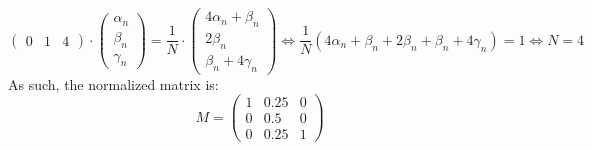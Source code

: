 \documentclass[11pt, legalpaper]{article}
\begin{document}
\begin{enumerate}
$$\begin{pmatrix}
        0 & 1 & 4
    \end{pmatrix} \cdot \begin{pmatrix} \alpha_n \\ \beta_n \\ \gamma_n \end{pmatrix}= \frac{1}{N} \cdot \begin{pmatrix} 4\alpha_n+\beta_n \\ 2\beta_n \\ \beta_n + 4\gamma_n \end{pmatrix} \Longleftrightarrow \frac{1}{N}(4\alpha_n+\beta_n +  2\beta_n + \beta_n + 4\gamma_n)=1 \Longleftrightarrow N=4 $$
    As such, the normalized matrix is:
    $$\boxed{M=\begin{pmatrix}
            1 & 0.25 & 0 \\
            0 & 0.5 & 0 \\
            0 & 0.25 & 1
        \end{pmatrix}}$$
    

\end{enumerate}
\end{document}
